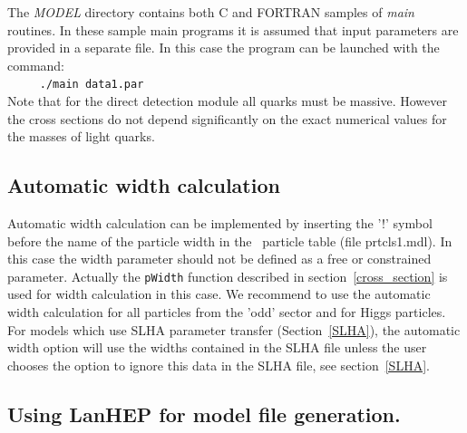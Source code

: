 \documentclass[12pt,a4paper]{article}
\begin{document}
The {\it MODEL} directory contains both  C and FORTRAN samples of {\it main}
routines. In these sample main programs it is assumed that input parameters are provided in a separate
file. In this case the  program can be launched with the command:\\
\verb|     ./main data1.par|\\
Note that for the direct detection module all quarks must be  massive. 
However the cross sections do not depend significantly on the exact  
numerical values for the masses of light quarks.

 
\subsection{Automatic width calculation}
Automatic width calculation can be 
implemented by  inserting the '!' symbol before the name of the particle width  in 
the \calchep\ particle table (file prtcls1.mdl). In this case the width parameter 
should not be defined as a free or constrained parameter. 
Actually the \verb|pWidth| function  described in section~\ref{cross_section} is  used for width calculation in this case.
We recommend to use the
automatic width calculation for all particles from the 'odd' sector and for
Higgs particles. 
For models which use SLHA parameter transfer (Section~\ref{SLHA}), 
the automatic width option will use the widths contained in the SLHA file unless the user chooses the option to
ignore this data in the SLHA file, see section~\ref{SLHA}. 


\subsection{Using LanHEP for model file generation.}
\end{document}
